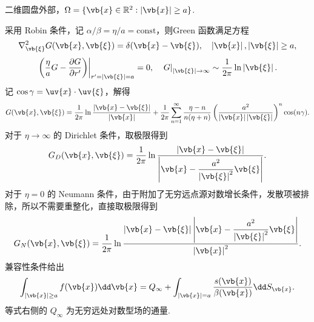\begin{exbox}
	二维圆盘外部，\(\Omega=\{\vb{x}\in\mathbb{R}^2:\left|\vb{x}\right|\geq a\}\).
	
	采用 Robin 条件，记 \(\alpha/\beta=\eta/a=\mathrm{const}\)，则Green 函数满足方程
	\begin{align*}
		\nabla_{\vb{\xi}}^2G(\vb{x},\vb{\xi})=\delta(\vb{x}-\vb{\xi}),\quad
		\left|\vb{x}\right|,\left|\vb{\xi}\right|\geq a,
	\end{align*}
	\begin{align*}
		\left.\left(\frac{\eta}{a}G-\frac{\partial G}{\partial r'}\right)\right|_{r'=\left|\vb{\xi}\right|=a}=0,
		\quad
		\left.G\right|_{\left|\vb{\xi}\right|\to\infty}\sim\frac{1}{2\pi}\ln\left|\vb{\xi}\right|.
	\end{align*}
	记 \(\cos\gamma=\uv{x}\cdot\uv{\xi}\)，解得
	\begin{align*}
		G(\vb{x},\vb{\xi})
		=\frac{1}{2\pi}\ln\frac{\left|\vb{x}-\vb{\xi}\right|}{\left|\vb{x}\right|}
		+\frac{1}{2\pi}\sum_{n=1}^\infty\frac{\eta-n}{n(\eta+n)}\left(\frac{a^2}{\left|\vb{x}\right|\left|\vb{\xi}\right|}\right)^n\cos(n\gamma).
	\end{align*}
	对于 \(\eta\to\infty\) 的 Dirichlet 条件，取极限得到
	\begin{align*}
		G_D(\vb{x},\vb{\xi})
		=\frac{1}{2\pi}\ln\frac{\left|\vb{x}-\vb{\xi}\right|}{\left|\vb{x}-\dfrac{a^2}{\left|\vb{\xi}\right|^2}\vb{\xi}\right|}.
	\end{align*}
	对于 \(\eta=0\) 的 Neumann 条件，由于附加了无穷远点源对数增长条件，发散项被排除，所以不需要重整化，直接取极限得到
	\begin{align*}
		G_N(\vb{x},\vb{\xi})
		=\frac{1}{2\pi}\ln\frac{\left|\vb{x}-\vb{\xi}\right|\left|\vb{x}-\dfrac{a^2}{\left|\vb{\xi}\right|^2}\vb{\xi}\right|}{\left|\vb{x}\right|^2}.
	\end{align*}
	兼容性条件给出
	\begin{align*}
		\int_{\left|\vb{x}\right|\geq a}f(\vb{x})\dd\vb{x}
		=Q_\infty+\int_{\left|\vb{x}\right|=a}\frac{s(\vb{x})}{\beta(\vb{x})}\dd S_{\vb{x}}.
	\end{align*}
	等式右侧的 \(Q_\infty\) 为无穷远处对数型场的通量.
\end{exbox}

